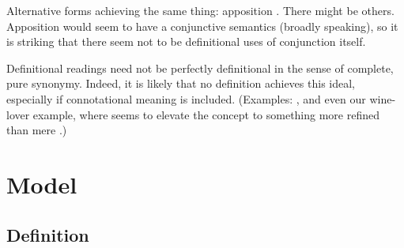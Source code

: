 \documentclass{article}
\begin{document}
\begin{examples}
\item Alternative forms achieving the same thing: apposition
  . There might be others. Apposition
  would seem to have a conjunctive semantics (broadly speaking), so it
  is striking that there seem not to be definitional uses of
  conjunction itself.

\item Definitional readings need not be perfectly definitional in the
  sense of complete, pure synonymy. Indeed, it is likely that no
  definition achieves this ideal, especially if connotational meaning
  is included. (Examples: , and
  even our wine-lover example, where  seems to elevate
  the concept to something more refined than mere .)
\end{examples}


\section{Model}\label{sec:model}

\subsection{Definition}\label{sec:definition}
\end{document}
